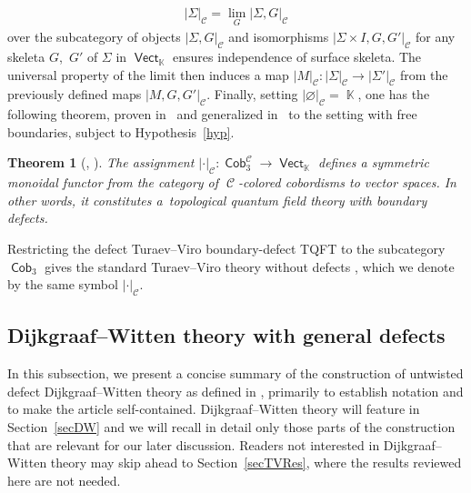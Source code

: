 \documentclass[pdftex]{sigma}
\DeclareMathOperator{\vect}{\mathsf{Vect}}
\DeclareMathOperator{\K}{\mathbb{K}}
\DeclareMathOperator{\Cob}{\mathsf{Cob}}
\DeclareMathOperator{\calc}{\mathcal{C}}
\numberwithin{equation}{section}
\newtheorem{Theorem}{Theorem}[section]
\theoremstyle{definition}
\begin{document}
\begin{enumerate}
 \begin{align*}
 |\Sigma|_{\calc} = \lim_G |\Sigma, G|_{\calc}
 \end{align*}
 over the subcategory of objects $|\Sigma, G|_{\calc}$ and isomorphisms $|\Sigma \times I, G, G'|_{\calc}$ for any skeleta $G$,~$G'$ of $\Sigma$ in $\vect_{\K}$ ensures independence of surface skeleta. The universal property of the limit then induces a map $|M|_{\calc}\colon |\Sigma|_{\calc} \rightarrow |\Sigma'|_{\calc}$ from the previously defined maps $|M, G, G'|_{\calc}$. Finally, setting $|\varnothing|_{\calc} = \K$, one has the following theorem, proven in~\cite{TV} and generalized in~\cite{F} to the setting with free boundaries, subject to Hypothesis~\ref{hyp}.
\end{enumerate}
\begin{Theorem}[{\cite[Theorem 15.9]{TV}, \cite[Section 4.2)]{F}}]
 The assignment $| \cdot |_{\calc}\colon \Cob_3^{\calc} \rightarrow \vect_{\K}$ defines a symmetric monoidal functor from the category of $\calc$-colored cobordisms to vector spaces. In other words, it constitutes a~topological quantum field theory with boundary defects.
\end{Theorem}
Restricting the defect Turaev--Viro boundary-defect TQFT to the subcategory $\Cob_3$ gives the standard Turaev--Viro theory without defects \cite[Section~13]{TV}, which we denote by the same symbol $|\cdot|_{\calc}$.

\subsection{Dijkgraaf--Witten theory with general defects}
\label{subSecDW}
In this subsection, we present a concise summary of the construction of untwisted defect Dijk\-graaf--Witten theory as defined in \cite{FMM}, primarily to establish notation and to make the article self-contained. Dijkgraaf--Witten theory will feature in Section~\ref{secDW} and we will recall in detail only those parts of the construction that are relevant for our later discussion. Readers not interested in Dijkgraaf--Witten theory may skip ahead to Section~\ref{secTVRes}, where the results reviewed here are not needed.
\end{document}
